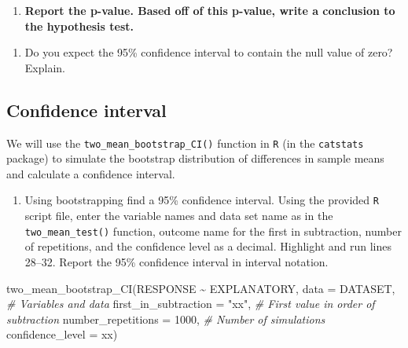 \documentclass[
]{report}
\newenvironment{Shaded}{\begin{snugshade}}{\end{snugshade}}
\newcommand{\AttributeTok}[1]{\textcolor[rgb]{0.77,0.63,0.00}{#1}}
\newcommand{\CommentTok}[1]{\textcolor[rgb]{0.56,0.35,0.01}{\textit{#1}}}
\newcommand{\DecValTok}[1]{\textcolor[rgb]{0.00,0.00,0.81}{#1}}
\newcommand{\FunctionTok}[1]{\textcolor[rgb]{0.00,0.00,0.00}{#1}}
\newcommand{\NormalTok}[1]{#1}
\newcommand{\SpecialCharTok}[1]{\textcolor[rgb]{0.00,0.00,0.00}{#1}}
\newcommand{\StringTok}[1]{\textcolor[rgb]{0.31,0.60,0.02}{#1}}
\providecommand{\tightlist}{%
  \setlength{\itemsep}{0pt}\setlength{\parskip}{0pt}}
\begin{document}
\begin{enumerate}
\def\labelenumi{\arabic{enumi}.}
\setcounter{enumi}{10}
\tightlist
\item
  \textbf{Report the p-value. Based off of this p-value, write a conclusion to the hypothesis test.}
\end{enumerate}

\vspace{0.8in}

\begin{enumerate}
\def\labelenumi{\arabic{enumi}.}
\setcounter{enumi}{11}
\tightlist
\item
  Do you expect the 95\% confidence interval to contain the null value of zero? Explain.
\end{enumerate}

\vspace{0.8in}

\hypertarget{confidence-interval-3}{%
\subsection*{Confidence interval}\label{confidence-interval-3}}

We will use the \texttt{two\_mean\_bootstrap\_CI()} function in \texttt{R} (in the \texttt{catstats} package) to simulate the bootstrap distribution of differences in sample means and calculate a confidence interval.

\begin{enumerate}
\def\labelenumi{\arabic{enumi}.}
\setcounter{enumi}{12}
\tightlist
\item
  Using bootstrapping find a 95\% confidence interval. Using the provided \texttt{R} script file, enter the variable names and data set name as in the \texttt{two\_mean\_test()} function, outcome name for the first in subtraction, number of repetitions, and the confidence level as a decimal. Highlight and run lines 28--32. Report the 95\% confidence interval in interval notation.
\end{enumerate}

\begin{Shaded}
\begin{Highlighting}[]
\FunctionTok{two\_mean\_bootstrap\_CI}\NormalTok{(RESPONSE }\SpecialCharTok{\textasciitilde{}}\NormalTok{ EXPLANATORY, }
                      \AttributeTok{data =}\NormalTok{ DATASET,  }\CommentTok{\# Variables and data}
                      \AttributeTok{first\_in\_subtraction =} \StringTok{"xx"}\NormalTok{, }\CommentTok{\# First value in order of subtraction}
                      \AttributeTok{number\_repetitions =} \DecValTok{1000}\NormalTok{,  }\CommentTok{\# Number of simulations}
                      \AttributeTok{confidence\_level =}\NormalTok{ xx)}
\end{Highlighting}
\end{Shaded}
\end{document}
